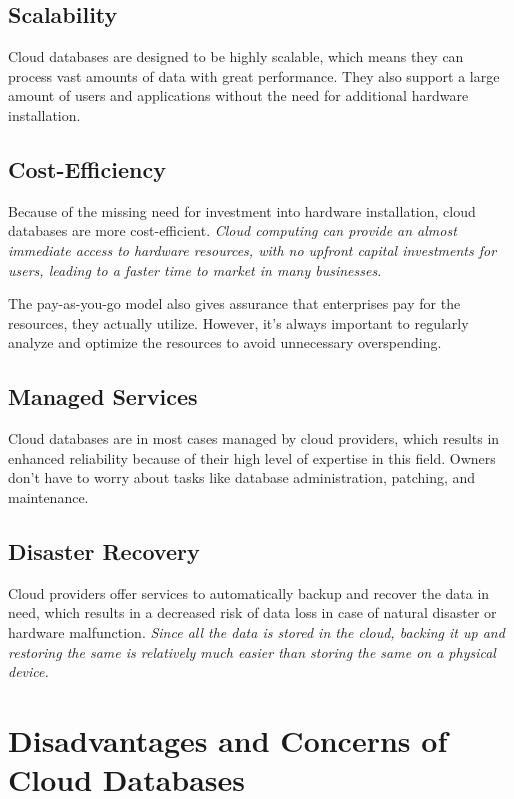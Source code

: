 \documentclass[12pt, a4paper]{article}
\begin{document}
    \subsection{Scalability}
        Cloud databases are designed to be highly scalable, which means they can process vast amounts of data with great performance. They also support a large amount of users and applications without the need for additional hardware installation.

    \subsection{Cost-Efficiency}
        Because of the missing need for investment into hardware installation, cloud databases are more cost-efficient. \textit{Cloud computing can provide an almost immediate access to hardware resources, with no upfront capital investments for users, leading to a faster time to market in many businesses.}\cite{12}\par The pay-as-you-go model also gives assurance that enterprises pay for the resources, they actually utilize. However, it's always important to regularly analyze and optimize the resources to avoid unnecessary overspending.
        
    \subsection{Managed Services}
        Cloud databases are in most cases managed by cloud providers, which results in enhanced reliability because of their high level of expertise in this field. Owners don't have to worry about tasks like database administration, patching, and maintenance.
        
    \subsection{Disaster Recovery}
        Cloud providers offer services to automatically backup and recover the data in need, which results in a decreased risk of data loss in case of natural disaster or hardware malfunction. \textit{Since all the data is stored in the cloud, backing it up and restoring the same is relatively much easier than storing the same on a physical device.}\cite{13}
\clearpage

\section{Disadvantages and Concerns of Cloud Databases}
\end{document}
